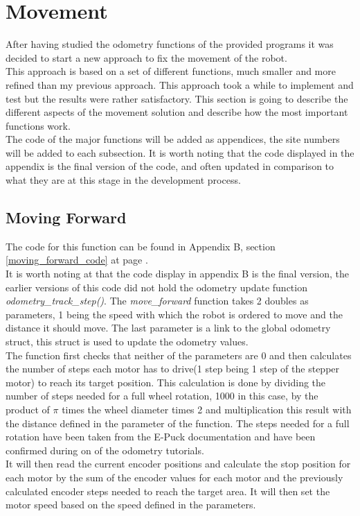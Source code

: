 \section{Movement}
After having studied the odometry functions of the provided programs it was decided to start a new approach to fix the movement of the robot.\\
This approach is based on a set of different functions, much smaller and more refined than my previous approach. This approach took a while to implement and test but the results were rather satisfactory. This section is going to describe the different aspects of the movement solution and describe how the most important functions work.\\
The code of the major functions will be added as appendices, the site numbers will be added to each subsection. It is worth noting that the code displayed in the appendix is the final version of the code, and often updated in comparison to what they are at this stage in the development process. 

\subsection{Moving Forward}
\label{moving_forward_description}
The code for this function can be found in Appendix B, section \ref{moving_forward_code} at page \pageref{moving_forward_code}.\\
It is worth noting at that the code display in appendix B is the final version, the earlier versions of this code did not hold the odometry update function \textit{odometry\_track\_step()}.
The \textit{move\_forward }function takes 2 doubles as parameters, 1 being the speed with which the robot is ordered to move and the distance it should move. The last parameter is a link to the global odometry struct, this struct is used to update the odometry values.\\
The function first checks that neither of the parameters are 0 and then calculates the number of steps each motor has to drive(1 step being 1 step of the stepper motor) to reach its target position.
This calculation is done by dividing the number of steps needed for a full wheel rotation, 1000 in this case, by the product of $\pi$ times the wheel diameter times 2 and multiplication this result with the distance defined in the parameter of the function. The steps needed for a full rotation have been taken from the E-Puck documentation and have been confirmed during on of the odometry tutorials. \\
It will then read the current encoder positions and calculate the stop position for each motor by the sum of the encoder values for each motor and the previously calculated encoder steps needed to reach the target area. 
It will then set the motor speed based on the speed defined in the parameters.\\[3ex]

